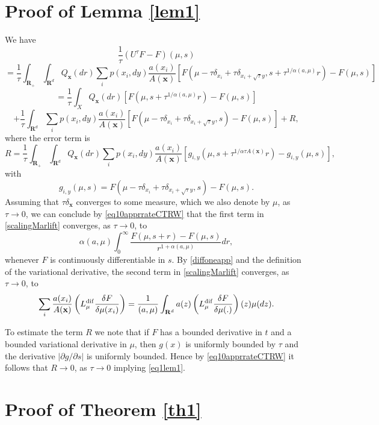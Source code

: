 \documentclass[12pt]{article}
\def\R{\mathbf{R}}
\def\x{\mathbf{x}}
\def\al{\alpha}
\def\pa{\partial}
\def\de{\delta}
\numberwithin{equation}{section}
\begin{document}
\section{Proof of Lemma \ref{lem1}}
\label{prooflemma}

We have
\[
\frac{1}{\tau}(U^{\tau}F-F)(\mu,s)
\]
\[
=\frac{1}{\tau}\int_{\R_+} \int_{\R^d} Q_{\x}(dr)\sum_i p(x_i, dy)\frac{a(x_i)}{A(\x)}
\left[F\left(\mu-\tau\de_{x_i}+\tau\de_{x_i+\sqrt{\tau}y}, s+\tau^{1/\al (a,\mu)}r\right)-F(\mu,s)\right]
\]
\[
=\frac{1}{\tau}\int_X  Q_{\x}(dr)
\left[F\left(\mu,s+\tau^{1/\al (a,\mu)}r\right)-F(\mu,s)\right]
\]
 \begin{equation}
\label{scalingMarlift}
+\frac{1}{\tau}\int_{\R^d} \sum_i p(x_i, dy)\frac{a(x_i)}{A(\x)}
\left[F\left(\mu-\tau\de_{x_i}+\tau\de_{x_i+\sqrt{\tau}y},s\right)-F(\mu,s)\right]+R,
\end{equation}
where the error term is
\[
R=\frac{1}{\tau}\int_{\R_+} \int_{\R^d} Q_{\x}(dr)\sum_i  p(x_i, dy)\frac{a(x_i)}{A(\x)}
\left[g_{i,y}(\mu,s+\tau^{1/\al \tau A(\x)}r)-g_{i,y}(\mu,s)\right],
\]
with
\[
g_{i,y}(\mu,s)=F\left(\mu-\tau\de_{x_i}+\tau\de_{x_i+\sqrt{\tau}y},s\right)-F(\mu,s).
\]
Assuming that $\tau \de_{\x}$ converges to some measure, which we also denote by $\mu$, as $\tau\to 0$,
we can conclude by \eqref{eq10apprrateCTRW} that the first term in   \eqref{scalingMarlift} converges, as $\tau\to 0$, to
\[
\al (a,\mu) \int_0^{\infty} \frac {F(\mu, s+r)-F(\mu,s)}{r^{1+\al (a, \mu)}} dr,
\]
whenever $F$ is continuously differentiable in $s$.
By \eqref{diffoneapp} and the definition of the variational derivative, the second term in
\eqref{scalingMarlift} converges, as $\tau\to 0$, to
\[
\sum_i \frac{a(x_i)}{A(\x)}\left(L^{\rm dif}_{\mu}\frac{\de F}{\de \mu(x_i)}\right)
=\frac{1}{(a,\mu)}\int_{\R^d}a(z)\left(L^{\rm dif}_{\mu}\frac{\de F}{\de \mu(.)}\right)(z) \mu (dz).
\]


To estimate the term $R$ we note that if $F$ has a bounded derivative in $t$
and a bounded variational derivative in $\mu$, then $g(x)$ is uniformly bounded by $\tau$
and the derivative $|\pa g/\pa s|$ is uniformly bounded. Hence by \eqref{eq10apprrateCTRW} it follows that
$R \to 0$, as $\tau \to 0$ implying \eqref{eq1lem1}.

\section{Proof of Theorem \ref{th1}}
\end{document}

